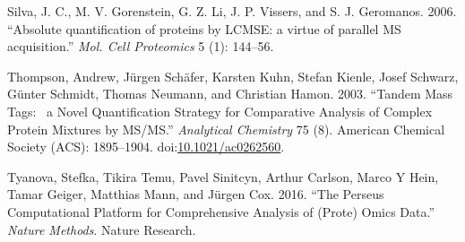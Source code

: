 \documentclass[]{article}
\begin{document}
\hypertarget{ref-silva2006}{}
Silva, J. C., M. V. Gorenstein, G. Z. Li, J. P. Vissers, and S. J.
Geromanos. 2006. ``Absolute quantification of proteins by LCMSE: a
virtue of parallel MS acquisition.'' \emph{Mol. Cell Proteomics} 5 (1):
144--56.

\hypertarget{ref-thompson2003}{}
Thompson, Andrew, Jürgen Schäfer, Karsten Kuhn, Stefan Kienle, Josef
Schwarz, Günter Schmidt, Thomas Neumann, and Christian Hamon. 2003.
``Tandem Mass Tags:~ a Novel Quantification Strategy for Comparative
Analysis of Complex Protein Mixtures by MS/MS.'' \emph{Analytical
Chemistry} 75 (8). American Chemical Society (ACS): 1895--1904.
doi:\href{https://doi.org/10.1021/ac0262560}{10.1021/ac0262560}.

\hypertarget{ref-tyanova2016}{}
Tyanova, Stefka, Tikira Temu, Pavel Sinitcyn, Arthur Carlson, Marco Y
Hein, Tamar Geiger, Matthias Mann, and Jürgen Cox. 2016. ``The Perseus
Computational Platform for Comprehensive Analysis of (Prote) Omics
Data.'' \emph{Nature Methods}. Nature Research.
\end{document}
